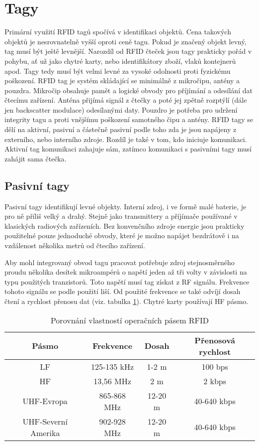 \section{Tagy}
Primární využití RFID tagů spočívá v identifikaci objektů. Cena takových objektů je nesrovnatelně vyšší oproti ceně tagu. Pokud je značený objekt levný, tag musí být ještě levnější. Narozdíl od RFID čteček jsou tagy prakticky pořád v pohybu, ať už jako chytré karty, nebo identifikátory zboží, vlaků kontejnerů apod. Tagy tedy musí být velmi levné za vysoké odolnosti proti fyzickému poškození\cite{The_RF_in_RFID}.
RFID tag je systém skládající se minimálně z mikročipu, antény a pouzdra. Mikročip obsahuje pamět a logické obvody pro příjímání a odesílání dat čtecímu zařízení. Anténa přijímá signál z čtečky a poté jej zpětně rozptýlí (dále jen backscatter modulace) odesílanými daty. Pouzdro je potřeba pro udržení integrity tagu a proti vnějšímu poškození samotného čipu a antény\cite{RFID_explained}.
RFID tagy se dělí na aktivní, pasivní a částečně pasivní podle toho zda je jsou napájeny z externího, nebo interního zdroje\cite{The_RF_in_RFID}. Rozdíl je také v tom, kdo iniciuje komunikaci. Aktivní tag komunikaci zahajuje sám, zatímco komunikaci s pasivními tagy musí zahájit sama čtečka\cite{Hazardous_areas}. 

\subsection{Pasivní tagy}
Pasivní tagy identifikují levné objekty. Interní zdroj, i ve formě malé baterie, je pro ně příliš velký a drahý. Stejně jako transmittery a příjímače používané v klasických radiových zařízeních. Bez konvenčního zdroje energie jsou prakticky použitelné pouze jednoduché obvody, které je možno napájet bezdrátově i na vzdálenost několika metrů od čtecího zařízení. 
\par 
Aby mohl integrovaný obvod tagu pracovat potřebuje zdroj stejnosměrného proudu několika desítek mikroampérů o napětí  jeden až tři volty v závislosti na typu použitých tranzistorů. Toto napětí musí tag získat z RF signálu\cite{The_RF_in_RFID}. Frekvence tohoto signálu se podle použití liší. Od použité frekvence se také odvíjí dosah čtení a rychlost přenosu dat (viz. tabulka \ref{tabulka_pasem}). Chytré karty používají HF pásmo\cite{Smart_Cards_Tokens_Security}. 

\begin{table}[]
\begin{tabular}{cccc}
\hline
Pásmo               & Frekvence   & Dosah   & Přenosová rychlost \\ \hline
LF                  & 125-135 kHz & 1-2 m   & 100 bps            \\
HF                  & 13,56 MHz   & 2 m     & 2 kbps             \\
UHF-Evropa          & 865-868 MHz & 12-20 m & 40-640 kbps        \\
UHF-Severní Amerika & 902-928 MHz & 12-20 m & 40-640 kbps        \\ \hline
\end{tabular}
\caption{Porovnání vlastností operačních pásem RFID\cite{RFID_explained}\cite{The_RF_in_RFID}}
\label{tabulka_pasem}
\end{table}


